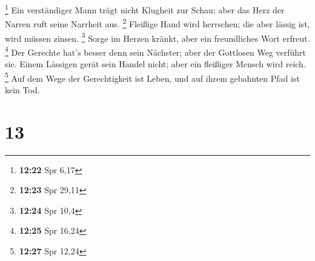 \footnote{\textbf{12:22} Spr 6,17}  Ein verständiger Mann
trägt nicht Klugheit zur Schau; aber das Herz der Narren ruft seine
Narrheit aus. \footnote{\textbf{12:23} Spr 29,11} 
Fleißige Hand wird herrschen; die aber lässig ist, wird müssen zinsen.
\footnote{\textbf{12:24} Spr 10,4}  Sorge im Herzen
kränkt, aber ein freundliches Wort erfreut. \footnote{\textbf{12:25} Spr
  16,24}  Der Gerechte hat's besser denn sein Nächster;
aber der Gottlosen Weg verführt sie.  Einem Lässigen
gerät sein Handel nicht; aber ein fleißiger Mensch wird reich.
\footnote{\textbf{12:27} Spr 12,24}  Auf dem Wege der
Gerechtigkeit ist Leben, und auf ihrem gebahnten Pfad ist kein Tod.

\hypertarget{section-12}{%
\section{13}\label{section-12}}


